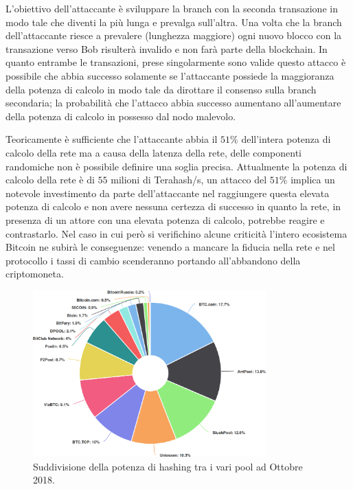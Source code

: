 L'obiettivo dell'attaccante è sviluppare la branch con la seconda transazione in modo tale che diventi la più lunga e prevalga sull'altra. Una volta che la branch dell'attaccante riesce a prevalere (lunghezza maggiore) ogni nuovo blocco con la transazione verso Bob risulterà invalido e non farà parte della blockchain.\newline
In quanto entrambe le transazioni, prese singolarmente sono valide questo attacco è possibile che abbia successo solamente se l'attaccante possiede la maggioranza della potenza di calcolo in modo tale da dirottare il consenso sulla branch secondaria; la probabilità che l'attacco abbia successo aumentano all'aumentare della potenza di calcolo in possesso dal nodo malevolo.

Teoricamente è sufficiente che l'attaccante abbia il $51\%$ dell'intera potenza di calcolo della rete ma a causa della latenza della rete, delle componenti randomiche non è possibile definire una soglia precisa.\newline
Attualmente la potenza di calcolo della rete è di $55$ milioni di Terahash/s, un attacco del $51\%$ implica un notevole investimento da parte dell'attaccante nel raggiungere questa elevata potenza di calcolo e non avere nessuna certezza di successo in quanto la rete, in presenza di un attore con una elevata potenza di calcolo, potrebbe reagire e contrastarlo. Nel caso in cui però si verifichino alcune criticità l'intero ecosistema Bitcoin ne subirà le conseguenze: venendo a mancare la fiducia nella rete e nel protocollo i tassi di cambio scenderanno portando all'abbandono della criptomoneta.
\begin{figure}[H]
    \centering
    \includegraphics[width=0.8\textwidth]{images/hashratedistribution.png}
    \caption{Suddivisione della potenza di hashing tra i vari pool ad Ottobre 2018.}
\end{figure}
